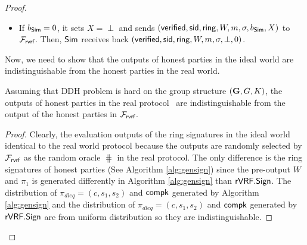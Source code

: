 \begin{proof}
\begin{itemize}
\begin{itemize}
\begin{itemize}
			\end{itemize}
			\item If $ b_{\mathsf{Sim}} = 0 $, it sets $ X = \perp $ and sends  $ (\mathsf{verified}, \textsf{sid}, \mathsf{ring}, W, m, \sigma, b_{\mathsf{Sim}}, X) $ to $ \mathcal{F}_{\textsf{rvrf}} $. Then, $ \mathsf{Sim} $ receives back $ (\mathsf{verified}, \textsf{sid}, \mathsf{ring}, W, m, \sigma, \perp, 0) $. 
			
		\end{itemize}
		
		
		
		
		
		
	\end{itemize}

	Now, we need to show that the outputs of honest parties in the ideal world are indistinguishable from the honest parties in the real world. 
	
	\begin{lemma}\label{lem:honestoutput}
			Assuming that DDH problem is hard on the group structure $ ({\mathbf{G}}, G,K) $, the outputs of honest parties in the real protocol \name\ are indistinguishable from the output of the honest parties in $ \mathcal{F}_{\textsf{rvrf}} $.
	\end{lemma}
		
		\begin{proof}
			Clearly, the evaluation outputs of the ring signatures in the ideal world identical to the real world protocol because  the outputs are randomly selected by $ \mathcal{F}_{\textsf{rvrf}} $ as the random oracle $ \hash $ in the real protocol. The only difference is the ring signatures of honest parties (See Algorithm \ref{alg:gensign}) since the pre-output $ W $ and $ \pi_1 $ is generated differently in Algorithm \ref{alg:gensign} than $ {\mathsf{rVRF}}.{\mathsf{Sign}} $. The distribution of $ \pi_{dleq} = (c,s_1, s_2) $ and $ \mathsf{compk} $ generated by Algorithm \ref{alg:gensign} and the distribution of $ \pi_{dleq} = (c,s_1, s_2) $ and $ \mathsf{compk} $ generated by $ {\mathsf{rVRF}}.{\mathsf{Sign}} $ are from uniform distribution so they are indistinguishable. 
			

\end{proof}
\end{proof}
